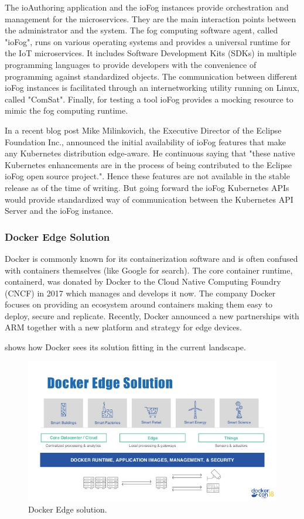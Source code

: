 The ioAuthoring application and the ioFog instances provide orchestration and management for the microservices. They are the main interaction points between the administrator and the system.
The fog computing software agent, called "ioFog", runs on various operating systems and provides a universal runtime for the IoT microservices. It includes Software Development Kits (SDKs) in multiple programming languages to provide developers with the convenience of programming against standardized objects. The communication between different ioFog instances is facilitated through an internetworking utility running on Linux, called "ComSat". Finally, for testing a tool ioFog provides a mocking resource to mimic the fog computing runtime.

In a recent blog post Mike Milinkovich, the Executive Director of the Eclipse Foundation Inc., announced the initial availability of ioFog features that make any Kubernetes distribution edge-aware. He continuous saying that "these native Kubernetes enhancements are in the process of being contributed to the Eclipse ioFog open source project.". Hence these features are not available in the stable release as of the time of writing. But going forward the ioFog Kubernetes APIs would provide standardized way of communication between the Kubernetes API Server and the ioFog instance.

\subsubsection{Docker Edge Solution}
Docker is commonly known for its containerization software and is often confused with containers themselves (like Google for search). The core container runtime, containerd, was donated by Docker to the Cloud Native Computing Foundry (CNCF) in 2017\cite{containerDonationDocker79:online} which manages and develops it now. The company Docker focuses on providing an ecosystem around containers making them easy to deploy, secure and replicate. Recently, Docker announced a new partnerships with ARM together with a new platform and strategy for edge devices.

 shows how Docker sees its solution fitting in the current landscape.
\begin{figure}[h!]
    \centering
    \includegraphics[scale=0.65]{figures/docker-edge-solution.jpg}
    \caption{Docker Edge solution.}
    \label{fig:dockerEdge}
\end{figure}


